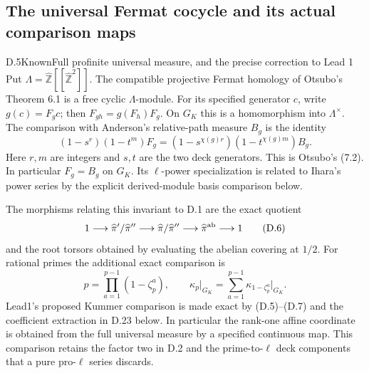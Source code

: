 \subsection{The universal Fermat cocycle and its actual comparison maps}

\begin{statement}{D.5}{Known}{Full profinite universal measure, and the precise correction to Lead 1}
Put $\Lambda=\widehat{\mathbb Z}[[\widehat{\mathbb Z}^2]]$. The compatible projective Fermat homology of Otsubo's Theorem 6.1 is a free cyclic $\Lambda$-module. For its specified generator $c$, write $g(c)=F_g c$; then
$F_{gh}=g(F_h)F_g$. On $G_K$ this is a homomorphism into $\Lambda^\times$. The comparison with Anderson's relative-path measure $B_g$ is the identity
\[
 (1-s^r)(1-t^m)F_g=(1-s^{\chi(g)r})(1-t^{\chi(g)m})B_g.       \tag{D.5}
\]
Here $r,m$ are integers and $s,t$ are the two deck generators. This is Otsubo's (7.2). In particular $F_g=B_g$ on $G_K$. Its $\ell$-power specialization is related to Ihara's power series by the explicit derived-module basis comparison below.

The morphisms relating this invariant to D.1 are the exact quotient
\[
 1\longrightarrow\widehat\pi'/\widehat\pi''
 \longrightarrow\widehat\pi/\widehat\pi''
 \longrightarrow\widehat\pi^{\rm ab}\longrightarrow1
                                                               \tag{D.6}
\]
and the root torsors obtained by evaluating the abelian covering at $1/2$. For rational primes the additional exact comparison is
\[
 p=\prod_{a=1}^{p-1}(1-\zeta_p^a),\qquad
 \kappa_p\big|_{G_K}=\sum_{a=1}^{p-1}\kappa_{1-\zeta_p^a}\big|_{G_K}.       \tag{D.7}
\]
Lead1's proposed Kummer comparison is made exact by (D.5)--(D.7) and the coefficient extraction in D.23 below. In particular the rank-one affine coordinate is obtained from the full universal measure by a specified continuous map. This comparison retains the factor two in D.2 and the prime-to-$\ell$ deck components that a pure pro-$\ell$ series discards.
\end{statement}
